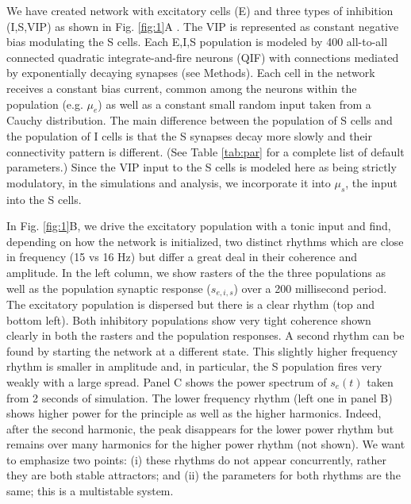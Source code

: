 \documentclass[10pt,letterpaper]{article}
\begin{document}
We have created  network with excitatory cells (E) and three types of inhibition (I,S,VIP) as shown in Fig. \ref{fig:1}A \cite{veit23,bos20,edwards24}.  The VIP is represented as constant negative bias modulating the  S cells. Each E,I,S population is modeled by 400  all-to-all connected quadratic integrate-and-fire neurons (QIF) with connections mediated by exponentially decaying synapses (see Methods).  Each cell in the network receives a constant bias current, common among the neurons within the population (e.g. $\mu_e$) as well as a constant small random input taken from a Cauchy distribution.  The main difference between the population of S cells and the population of I cells is that the S synapses decay more slowly \cite{edwards24} and their connectivity pattern is different. (See Table \ref{tab:par} for a complete list of default parameters.)  Since the VIP input to the S cells is modeled here as being strictly modulatory, in the simulations and analysis, we incorporate it into $\mu_s$, the input into the S cells.

In Fig. \ref{fig:1}B, we drive the excitatory population with a tonic input and find, depending on how the network is initialized, two distinct rhythms which are close in frequency (15 vs 16 Hz) but differ a great deal in their coherence and amplitude.  In the left column, we show rasters of the the three populations as well as the population synaptic response ($s_{e,i,s}$) over a 200 millisecond period.  The excitatory population is dispersed but there is a clear rhythm (top and bottom left). Both inhibitory populations show very tight coherence shown clearly in both the rasters and the population responses.  A second rhythm can be found by starting the network at a different state.  This slightly higher frequency rhythm is smaller in amplitude and, in particular, the S population fires very weakly with a large spread.  Panel C shows the power spectrum of $s_e(t)$ taken from 2 seconds of simulation.  The lower frequency rhythm (left one in panel B) shows higher power for the principle as well as the higher harmonics. Indeed, after the second harmonic, the peak disappears for the lower power rhythm but remains over many harmonics for the higher power rhythm (not shown).  We want to emphasize two points: (i) these rhythms do not appear concurrently, rather they are both stable attractors; and (ii) the parameters for both rhythms are the same; this is a multistable system.
\end{document}
